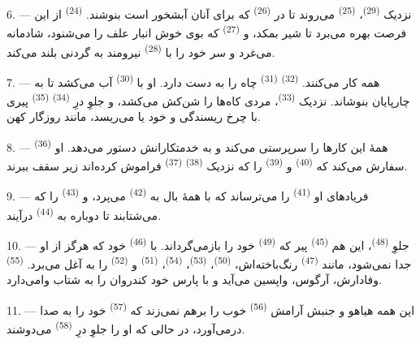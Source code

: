 6. --- نزدیک  \textsuperscript{(29)}، 
\textsuperscript{(25)} می‌روند تا در 
\textsuperscript{(26)} که برای آنان آبشخور است بنوشند.
 \textsuperscript{(24)} از این فرصت بهره می‌برد تا شیر
بمکد، و  \textsuperscript{(27)} که بوی خوش انبار علف را
می‌شنود، شادمانه می‌غرد و سر خود را با 
\textsuperscript{(28)} نیرومند به گردنی بلند می‌کند.

7. --- همه کار می‌کنند.  \textsuperscript{(32)}
 \textsuperscript{(31)} چاه را به دست دارد. او با
 \textsuperscript{(30)} آب می‌کشد تا به چارپایان بنوشاند.
نزدیک  \textsuperscript{(33)}، مردی کاه‌ها را شن‌کش
می‌کشد، و جلوِ درِ  \textsuperscript{(34)}  \textsuperscript{(35)} پیری با چرخ ریسندگی و 
خود  یا  می‌ریسد، مانند روزگار کهن.

\VUsaut{3.0mm}
\VUsaut{3.0mm}

8. ---  \textsuperscript{(36)} همهٔ این کارها را
سرپرستی می‌کند و به خدمتکارانش دستور می‌دهد. او سفارش می‌کند که
 \textsuperscript{(40)} و 
\textsuperscript{(39)} را که نزدیک  \textsuperscript{(38)}
 \textsuperscript{(37)} فراموش کرده‌اند زیر سقف ببرند.

9. --- فریادهای او  \textsuperscript{(41)} را می‌ترساند
که با همهٔ بال به  \textsuperscript{(42)} می‌پرد، و
 \textsuperscript{(43)} را که می‌شتابند تا دوباره به
 \textsuperscript{(44)} درآیند.

10. --- جلوِ  \textsuperscript{(48)}، این هم
 \textsuperscript{(45)} پیر که 
\textsuperscript{(49)} خود را بازمی‌گرداند. با 
\textsuperscript{(46)} خود که هرگز از او جدا نمی‌شود، مانند
 \textsuperscript{(47)} رنگ‌باخته‌اش، 
\textsuperscript{(50)}،  \textsuperscript{(53)}،
 \textsuperscript{(54)}، 
\textsuperscript{(51)} و  \textsuperscript{(52)} را
به آغل می‌برد.  \textsuperscript{(55)} وفادارش، آرگوس،
واپسین می‌آید و با پارس خود کندروان را به شتاب وامی‌دارد.

11. --- این همه هیاهو و جنبش آرامش 
\textsuperscript{(56)} خوب را برهم نمی‌زند که 
\textsuperscript{(57)} خود را به صدا درمی‌آورد، در حالی که او را جلوِ
درِ  \textsuperscript{(58)} می‌دوشند.

